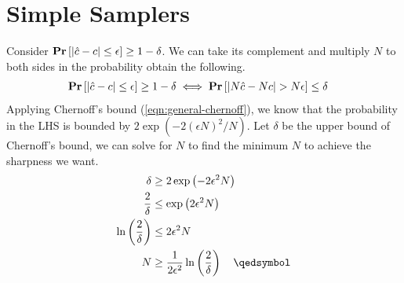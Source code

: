 \chapter{Simple Samplers}

Consider $\mathbf{Pr}\left[|\hat{c} - c| \leq \epsilon\right] \geq 1 - \delta$. We can take its complement and multiply $N$ to both sides in the probability obtain the following.
\begin{equation*}
\begin{aligned}
	\mathbf{Pr}\left[|\hat{c} - c| \leq \epsilon\right] \geq 1 - \delta &\iff \mathbf{Pr}\left[|N\hat{c} - Nc| > N\epsilon\right] \leq \delta
\end{aligned}
\end{equation*}
Applying Chernoff's bound (\ref{eqn:general-chernoff}), we know that the probability in the LHS is bounded by $2\exp(-2(\epsilon N)^2 / N)$. Let $\delta$ be the upper bound of Chernoff's bound, we can solve for $N$ to find the minimum $N$ to achieve the sharpness we want.
\begin{equation*}
\begin{aligned}
	\delta &\geq 2\exp\left(-2\epsilon^2N\right) \\
	\frac{2}{\delta} &\leq \exp\left(2\epsilon^2N\right) \\
	\ln\left(\frac{2}{\delta}\right) &\leq 2\epsilon^2N \\
	N &\geq \frac{1}{2\epsilon^2}\ln\left(\frac{2}{\delta}\right) \quad \qedsymbol
\end{aligned}
\end{equation*}
